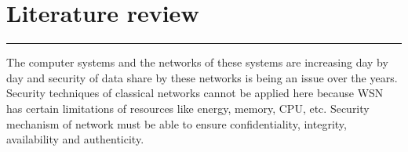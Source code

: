 \chapter{Literature review}
\label{C4} %
\graphicspath{{Figures/PDF/}{Figures/PNG/}}
\noindent\rule{\linewidth}{2pt}


\noindent
The computer systems and the networks of these systems are increasing day by day and security of data share by these networks is being an issue over the years. Security techniques of classical networks cannot be applied here because WSN has certain limitations of resources like energy, memory, CPU, etc. Security mechanism of network must be able to ensure confidentiality, integrity, availability and authenticity.

